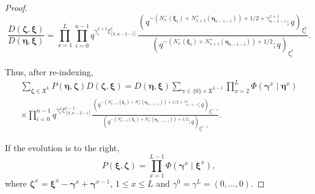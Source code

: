 \documentclass{ximera}
\begin{document}
\begin{proof}
\begin{equation*}
  \frac{D (\boldsymbol\zeta,\boldsymbol\xi)}{D(\boldsymbol\eta,\boldsymbol\xi)} =\prod_{x=1}^L\prod_{i=0}^{n-1}q^{\gamma_i^{x+1}\xi_{[0,n-2-i]}^{x}}\frac{\left(q^{-\left(N_{x}^-(\boldsymbol\xi_i)+N_{x+1}^+(\boldsymbol\eta_{n-1-i})\right)+1/2+\gamma_{n-1-i}^{x+1}};q\right)_{\xi_i^x}}{\left(q^{-\left(N_{x}^-(\boldsymbol\xi_i)+N_{x+1}^+(\boldsymbol\eta_{n-1-i})\right)+1/2};q\right)_{\xi_i^x}}.
\end{equation*}

Thus, after re-indexing,
\begin{multline*}
      \sum_{\boldsymbol\zeta\in\mathfrak{X}^L}P(\boldsymbol\eta,\boldsymbol\zeta)D(\boldsymbol\zeta,\boldsymbol\xi)= D(\boldsymbol\eta,\boldsymbol\xi)
       \sum_{\boldsymbol\gamma\in \{0\}\times \mathfrak{X}^{L-1} }\prod_{x=2}^L\Phi(\boldsymbol\gamma^x\mid\boldsymbol\eta^x)\\\times\prod_{i=0}^{n-1}q^{\gamma_i^{x}\xi_{[0,n-2-i]}^{x-1}}\frac{\left(q^{-\left(N_{x-1}^-(\boldsymbol\xi_i)+N_{x}^+(\boldsymbol\eta_{n-1-i})\right)+1/2+\gamma_{n-1-i}^{x}};q\right)_{\xi_i^{x-1}}}{\left(q^{-\left(N_{x-1}^-(\boldsymbol\xi_i)+N_{x}^+(\boldsymbol\eta_{n-1-i})\right)+1/2};q\right)_{\xi_i^{x-1}}}.
\end{multline*}
      


If the evolution is to the right, 
\begin{equation*}
    P(\boldsymbol\xi,\boldsymbol\zeta)=\prod_{x=1}^{L-1}\Phi(\boldsymbol\gamma^x\mid\boldsymbol\xi^x),
\end{equation*}
where $\boldsymbol\zeta^x=\boldsymbol\xi^x-\boldsymbol\gamma^x+\boldsymbol\gamma^{x-1}$, $1\le x\le L$ and $\gamma^0=\gamma^{L}=(0,\ldots,0)$.


\end{proof}
\end{document}
